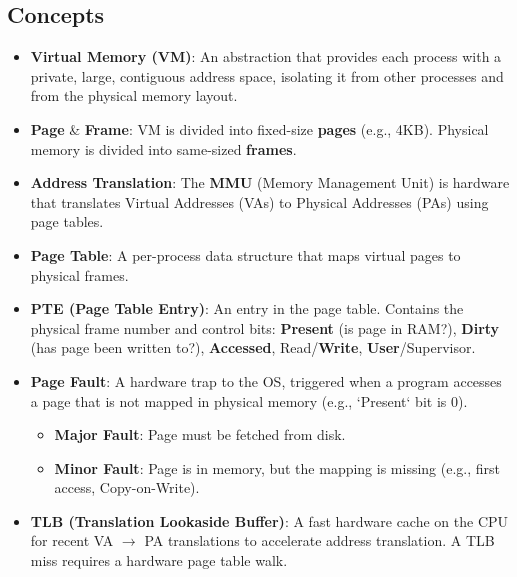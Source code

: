\documentclass[8pt,a4paper]{article}
\begin{document}
\begin{multicols}{2}
\subsection*{Concepts}
\begin{itemize}
    \item \textbf{Virtual Memory (VM)}: An abstraction that provides each process with a private, large, contiguous address space, isolating it from other processes and from the physical memory layout.
    \item \textbf{Page} \& \textbf{Frame}: VM is divided into fixed-size \textbf{pages} (e.g., 4KB). Physical memory is divided into same-sized \textbf{frames}.
    \item \textbf{Address Translation}: The \textbf{MMU} (Memory Management Unit) is hardware that translates Virtual Addresses (VAs) to Physical Addresses (PAs) using page tables.
    \item \textbf{Page Table}: A per-process data structure that maps virtual pages to physical frames.
    \item \textbf{PTE (Page Table Entry)}: An entry in the page table. Contains the physical frame number and control bits: \textbf{Present} (is page in RAM?), \textbf{Dirty} (has page been written to?), \textbf{Accessed}, Read/\textbf{Write}, \textbf{User}/Supervisor.
    \item \textbf{Page Fault}: A hardware trap to the OS, triggered when a program accesses a page that is not mapped in physical memory (e.g., `Present` bit is 0).
        \begin{itemize}
            \item \textbf{Major Fault}: Page must be fetched from disk.
            \item \textbf{Minor Fault}: Page is in memory, but the mapping is missing (e.g., first access, Copy-on-Write).
        \end{itemize}
    \item \textbf{TLB (Translation Lookaside Buffer)}: A fast hardware cache on the CPU for recent VA $\to$ PA translations to accelerate address translation. A TLB miss requires a hardware page table walk.
\end{itemize}


\end{multicols}
\end{document}
